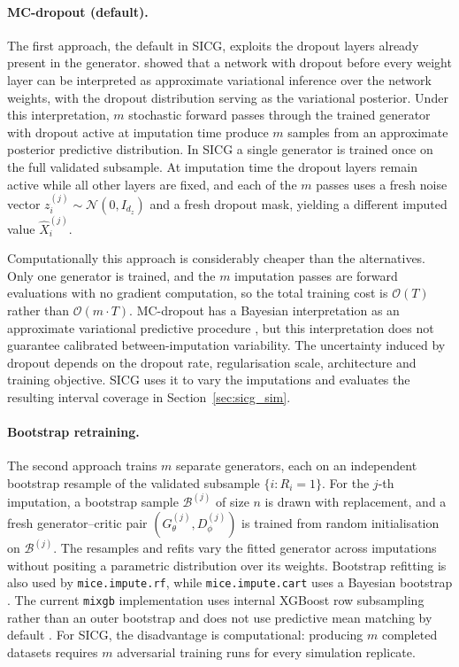 \paragraph{MC-dropout (default).} The first approach, the default in SICG, exploits the dropout layers already present in the generator. \citet{gal2016dropout} showed that a network with dropout before every weight layer can be interpreted as approximate variational inference over the network weights, with the dropout distribution serving as the variational posterior. Under this interpretation, $m$ stochastic forward passes through the trained generator with dropout active at imputation time produce $m$ samples from an approximate posterior predictive distribution. In SICG a single generator is trained once on the full validated subsample. At imputation time the dropout layers remain active while all other layers are fixed, and each of the $m$ passes uses a fresh noise vector $z_i^{(j)} \sim \mathcal{N}(0, I_{d_z})$ and a fresh dropout mask, yielding a different imputed value $\hat{X}_i^{(j)}$.

Computationally this approach is considerably cheaper than the alternatives. Only one generator is trained, and the $m$ imputation passes are forward evaluations with no gradient computation, so the total training cost is $\mathcal{O}(T)$ rather than $\mathcal{O}(m \cdot T)$. MC-dropout has a Bayesian interpretation as an approximate variational predictive procedure \citep{gal2016dropout}, but this interpretation does not guarantee calibrated between-imputation variability. The uncertainty induced by dropout depends on the dropout rate, regularisation scale, architecture and training objective. SICG uses it to vary the imputations and evaluates the resulting interval coverage in Section~\ref{sec:sicg_sim}.

\paragraph{Bootstrap retraining.} The second approach trains $m$ separate generators, each on an independent bootstrap resample of the validated subsample $\{i : R_i = 1\}$. For the $j$-th imputation, a bootstrap sample $\mathcal{B}^{(j)}$ of size $n$ is drawn with replacement, and a fresh generator--critic pair $(G_\theta^{(j)}, D_\phi^{(j)})$ is trained from random initialisation on $\mathcal{B}^{(j)}$. The resamples and refits vary the fitted generator across imputations without positing a parametric distribution over its weights. Bootstrap refitting is also used by \texttt{mice.impute.rf}, while \texttt{mice.impute.cart} uses a Bayesian bootstrap \citep{doove2014recursive,burgette2010multiple}. The current \texttt{mixgb} implementation uses internal XGBoost row subsampling rather than an outer bootstrap and does not use predictive mean matching by default \citep{deng2024multiple}. For SICG, the disadvantage is computational: producing $m$ completed datasets requires $m$ adversarial training runs for every simulation replicate.


